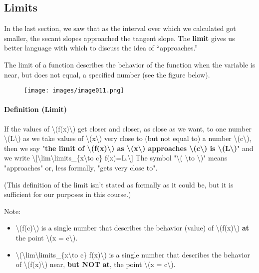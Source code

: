 \hypertarget{limits}{%
\subsection{Limits}\label{limits}}

In the last section, we saw that as the interval over which we
calculated got smaller, the secant slopes approached the tangent slope.
The \textbf{limit} gives us better language with which to discuss the
idea of ``approaches.''

The limit of a function describes the behavior of the function when the
variable is near, but does not equal, a specified number (see the figure
below).

\begin{figure}
\centering
\texttt{[image: images/image011.png]}
\caption{}
\end{figure}

\hypertarget{definition-limit}{%
\paragraph{Definition (Limit)}\label{definition-limit}}

If the values of \textbackslash{}(f(x)\textbackslash{}) get closer and
closer, as close as we want, to one number
\textbackslash{}(L\textbackslash{}) as we take values of
\textbackslash{}(x\textbackslash{}) very close to (but not equal to) a
number \textbackslash{}(c\textbackslash{}), then we say "\textbf{the
limit of \textbackslash{}(f(x)\textbackslash{}) as
\textbackslash{}(x\textbackslash{}) approaches
\textbackslash{}(c\textbackslash{}) is
\textbackslash{}(L\textbackslash{})}" and we write
\textbackslash{}{[}\textbackslash{}lim\textbackslash{}limits\_\{x\textbackslash{}to
c\} f(x)=L.\textbackslash{}{]} The symbol "\textbackslash{}(
\textbackslash{}to \textbackslash{})" means "approaches" or, less
formally, "gets very close to".

(This definition of the limit isn't stated as formally as it could be,
but it is sufficient for our purposes in this course.)

Note:

\begin{itemize}
\tightlist
\item
  \textbackslash{}(f(c)\textbackslash{}) is a single number that
  describes the behavior (value) of
  \textbackslash{}(f(x)\textbackslash{}) \textbf{at} the point
  \textbackslash{}(x = c\textbackslash{}).
\item
  \textbackslash{}(\textbackslash{}lim\textbackslash{}limits\_\{x\textbackslash{}to
  c\} f(x)\textbackslash{}) is a single number that describes the
  behavior of \textbackslash{}(f(x)\textbackslash{}) near, \textbf{but
  NOT at}, the point \textbackslash{}(x = c\textbackslash{}).
\end{itemize}

